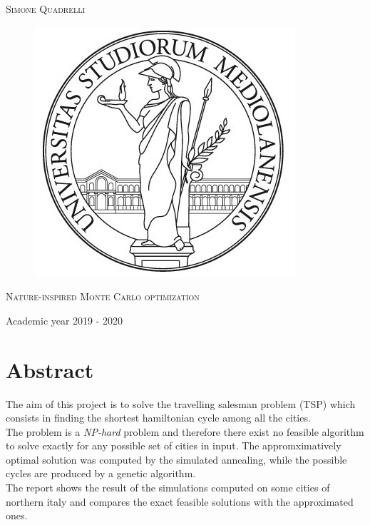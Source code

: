 \documentclass{article}
\begin{document}
\begin{titlepage}
	
	
	\begin{center}
		\vspace{2 cm}
		{\Large \textsc{Simone Quadrelli} }
	\end{center}
	
	
	\begin{figure}[H]
		\vspace{2 cm}
		\centering
		\includegraphics[width=0.30\linewidth]{tesiSCIENZE_TECNOLOGIE.jpg}
		
	\end{figure}
	
	\begin{center}
		\vspace{2 cm}
		{\Large \textsc{Nature-inspired Monte Carlo optimization} }
	\end{center}

	\par
	\vspace{3 cm}
	
	\begin{center}
		{\large Academic year 2019 - 2020}
	\end{center}
\end{titlepage}

\newpage 
{}
\tableofcontents
\listoftables
\listoffigures
\newpage


\section*{Abstract}
The aim of this project is to solve the travelling salesman problem (TSP) which consists in finding the shortest hamiltonian cycle among all the cities.\\
The problem is a \textit{NP-hard} problem and therefore there exist no feasible algorithm to solve exactly for any possible set of cities in input. The appromximatively optimal solution was computed by the simulated annealing, while the possible cycles are produced by a genetic algorithm.\\
The report shows the result of the simulations computed on some cities of northern italy and compares the exact feasible solutions with the approximated ones.
\end{document}

